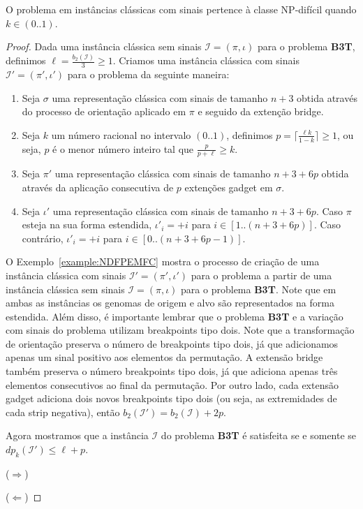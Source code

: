 \begin{theorem}
O problema \SbPRT{} em instâncias clássicas com sinais pertence à classe NP-difícil quando $k \in (0..1)$.
\end{theorem}
\begin{proof}
Dada uma instância clássica sem sinais $\mathcal{I}=(\pi,\iota)$ para o problema \textbf{B3T}, definimos $\ell = \frac{b_2(\mathcal{I})}{3} \ge 1$. Criamos uma instância clássica com sinais $\mathcal{I'}=(\pi',\iota')$ para o problema \SbPRT{} da seguinte maneira:

\begin{enumerate}
  \item Seja $\sigma$ uma representação clássica com sinais de tamanho $n+3$ obtida através do processo de orientação aplicado em $\pi$ e seguido da extenção bridge.
  \item Seja $k$ um número racional no intervalo $(0..1)$, definimos $p = \lceil\frac{\ell k}{1-k}\rceil \ge 1$, ou seja, $p$ é o menor número inteiro tal que $\frac{p}{p+\ell} \ge k$.
  \item Seja $\pi'$ uma representação clássica com sinais de tamanho $n+3+6p$ obtida através da aplicação consecutiva de $p$ extenções gadget em $\sigma$.
  \item Seja $\iota'$ uma representação clássica com sinais de tamanho $n+3+6p$. Caso $\pi$ esteja na sua forma estendida, $\iota'_i = +i$ para $i \in [1..(n+3+6p)]$. Caso contrário,  $\iota'_i = +i$ para $i \in [0..(n+3+6p-1)]$.
\end{enumerate}

O Exemplo~\ref{example:NDFPEMFC} mostra o processo de criação de uma instância clássica com sinais $\mathcal{I'}=(\pi',\iota')$ para o problema \SbPRT{} a partir de uma instância clássica sem sinais $\mathcal{I}=(\pi,\iota)$ para o problema \textbf{B3T}. Note que em ambas as instâncias os genomas de origem e alvo são representados na forma estendida. Além disso, é importante lembrar que o problema \textbf{B3T} e a variação com sinais do problema \SbPRT{} utilizam breakpoints tipo dois. Note que a transformação de orientação preserva o número de breakpoints tipo dois, já que adicionamos apenas um sinal positivo aos elementos da permutação. A extensão bridge também preserva o número breakpoints tipo dois, já que adiciona apenas três elementos consecutivos ao final da permutação. Por outro lado, cada extensão gadget adiciona dois novos breakpoints tipo dois (ou seja, as extremidades de cada strip negativa), então $b_2(\mathcal{I'}) = b_2(\mathcal{I}) +2p$.



Agora mostramos que a instância $\mathcal{I}$ do problema \textbf{B3T} é satisfeita se e somente se $dp_k(\mathcal{I'}) \le \ell+p$.

($\Rightarrow$)

($\Leftarrow$)

\end{proof}
